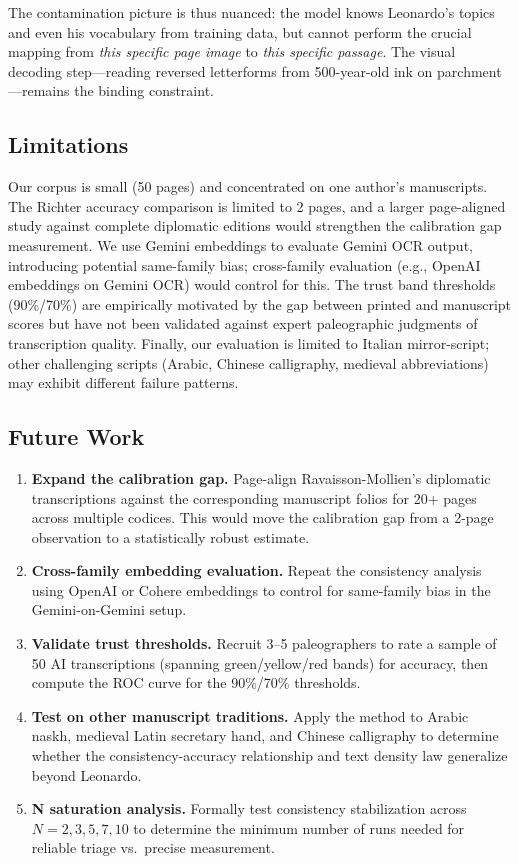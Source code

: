 \documentclass[10pt,twocolumn]{article}
\begin{document}
The contamination picture is thus nuanced: the model knows Leonardo's topics and even his vocabulary from training data, but cannot perform the crucial mapping from \emph{this specific page image} to \emph{this specific passage}. The visual decoding step---reading reversed letterforms from 500-year-old ink on parchment---remains the binding constraint.

\subsection{Limitations}

Our corpus is small (50 pages) and concentrated on one author's manuscripts. The Richter accuracy comparison is limited to 2 pages, and a larger page-aligned study against complete diplomatic editions would strengthen the calibration gap measurement. We use Gemini embeddings to evaluate Gemini OCR output, introducing potential same-family bias; cross-family evaluation (e.g., OpenAI embeddings on Gemini OCR) would control for this. The trust band thresholds (90\%/70\%) are empirically motivated by the gap between printed and manuscript scores but have not been validated against expert paleographic judgments of transcription quality. Finally, our evaluation is limited to Italian mirror-script; other challenging scripts (Arabic, Chinese calligraphy, medieval abbreviations) may exhibit different failure patterns.

\subsection{Future Work}

\begin{enumerate}
\item \textbf{Expand the calibration gap.} Page-align Ravaisson-Mollien's diplomatic transcriptions against the corresponding manuscript folios for 20+ pages across multiple codices. This would move the calibration gap from a 2-page observation to a statistically robust estimate.
\item \textbf{Cross-family embedding evaluation.} Repeat the consistency analysis using OpenAI or Cohere embeddings to control for same-family bias in the Gemini-on-Gemini setup.
\item \textbf{Validate trust thresholds.} Recruit 3--5 paleographers to rate a sample of 50 AI transcriptions (spanning green/yellow/red bands) for accuracy, then compute the ROC curve for the 90\%/70\% thresholds.
\item \textbf{Test on other manuscript traditions.} Apply the method to Arabic naskh, medieval Latin secretary hand, and Chinese calligraphy to determine whether the consistency-accuracy relationship and text density law generalize beyond Leonardo.
\item \textbf{N saturation analysis.} Formally test consistency stabilization across $N{=}2,3,5,7,10$ to determine the minimum number of runs needed for reliable triage vs.\ precise measurement.
\end{enumerate}
\end{document}
